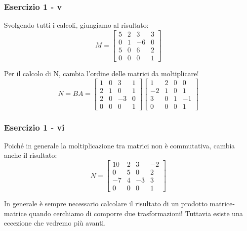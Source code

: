 \documentclass{beamer}
\begin{document}
\begin{frame}
\frametitle{Esercizio 1 - v}
Svolgendo tutti i calcoli, giungiamo al risultato:
\begin{displaymath}
    M =
\begin{bmatrix}
   5 &  2 &  3 &  3 \\
   0 &  1 & -6 &  0 \\
   5 &  0 &  6 &  2 \\
   0 &  0 &  0 &  1
\end{bmatrix}
\end{displaymath}

Per il calcolo di N, cambia l'ordine delle matrici da moltiplicare!
\begin{displaymath}
    N = B A =
\begin{bmatrix}
   1 &  0 &  3 &  1 \\
   2 &  1 &  0 &  1 \\
   2 &  0 & -3 &  0 \\
   0 &  0 &  0 &  1 
\end{bmatrix}
\begin{bmatrix}
   1 &  2 &  0 &  0 \\
  -2 &  1 &  0 &  1 \\
   3 &  0 &  1 & -1 \\
   0 &  0 &  0 &  1
\end{bmatrix}
\end{displaymath}

\end{frame}
%
\begin{frame}
\frametitle{Esercizio 1 - vi}
Poich\'e in generale la moltiplicazione tra matrici non \`e commutativa, cambia anche il risultato:
\begin{displaymath}
    N =
\begin{bmatrix}
  10 &  2 &  3 & -2 \\
   0 &  5 &  0 &  2 \\
  -7 &  4 & -3 &  3 \\
   0 &  0 &  0 &  1
\end{bmatrix}
\end{displaymath}

In generale \`e sempre necessario calcolare il risultato di un prodotto matrice-matrice
quando cerchiamo di comporre due trasformazioni! Tuttavia esiste una eccezione che vedremo pi\`u avanti.

\end{frame}
%
\end{document}
